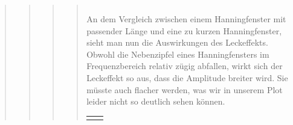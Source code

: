 \begin{quote}
\begin{quote}
\begin{quote}
\begin{quote}
\begin{center}
\begin{tabular}{ll}
                \end{tabular}
                \end{center}
                
                An dem Vergleich zwischen einem Hanningfenster mit passender
                Länge und eine zu kurzen Hanningfenster, sieht man nun die
                Auswirkungen des Leckeffekts. Obwohl die Nebenzipfel eines
                Hanningfensters im Frequenzbereich relativ zügig abfallen, wirkt
                sich der Leckeffekt so aus, dass die Amplitude breiter wird. Sie
                müsste auch flacher werden, was wir in unserem Plot leider nicht
                so deutlich sehen können.
                
                \begin{center}
                \begin{tabular}{ll}
    
                \hspace{-11em}
                    \begin{minipage}{0.6\textwidth}
    

\end{minipage}
\end{tabular}
\end{center}
\end{quote}
\end{quote}
\end{quote}
\end{quote}
